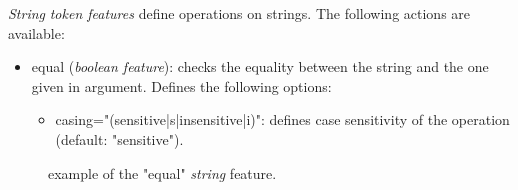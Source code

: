 \documentclass[manual-fr.tex]{subfiles}
\begin{document}
\emph{String} \textit{token features} define operations on strings. The following actions are available:
\begin{itemize}
    \item equal (\textit{boolean feature}): checks the equality between the string and the one given in argument. Defines the following options:
    \begin{itemize}
        \item casing="(sensitive|s|insensitive|i)": defines case sensitivity of the operation (default: "sensitive").
    \end{itemize}
\end{itemize}

\begin{figure}[ht!]
\footnotesize
\begin{xml}
\end{xml}
\caption{example of the "equal" \textit{string} feature.}
\label{fig:feature-string-equal}
\end{figure}
\end{document}
